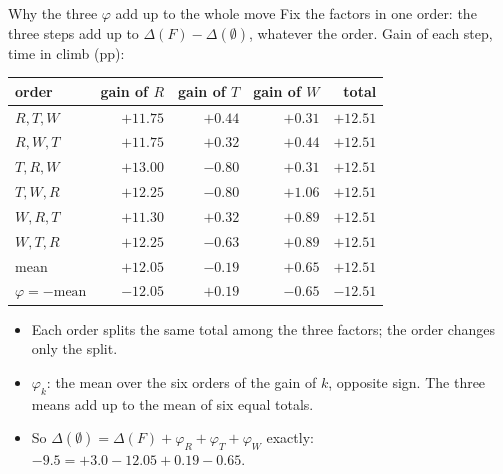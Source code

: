 \documentclass[11pt,aspectratio=169]{beamer}
\begin{document}
\begin{frame}[label=app-phisum]{Why the three $\varphi$ add up to the whole move}
\vspace{-3mm}
\noindent\small Fix the factors in one order: the three steps add up to $\Delta(F)-\Delta(\emptyset)$, whatever the order. Gain of each step, time in climb (pp):
\begin{center}\footnotesize
\renewcommand{\arraystretch}{1.0}
\begin{tabular}{@{}l r r r r@{}}
\toprule
order & gain of $R$ & gain of $T$ & gain of $W$ & total \\
\midrule
$R,T,W$ & $+11.75$ & $+0.44$ & $+0.31$ & $+12.51$ \\
$R,W,T$ & $+11.75$ & $+0.32$ & $+0.44$ & $+12.51$ \\
$T,R,W$ & $+13.00$ & $-0.80$ & $+0.31$ & $+12.51$ \\
$T,W,R$ & $+12.25$ & $-0.80$ & $+1.06$ & $+12.51$ \\
$W,R,T$ & $+11.30$ & $+0.32$ & $+0.89$ & $+12.51$ \\
$W,T,R$ & $+12.25$ & $-0.63$ & $+0.89$ & $+12.51$ \\
\midrule
mean & $+12.05$ & $-0.19$ & $+0.65$ & $+12.51$ \\
$\varphi=-\text{mean}$ & $-12.05$ & $+0.19$ & $-0.65$ & $-12.51$ \\
\bottomrule
\end{tabular}
\end{center}
\begin{itemize}\small
  \item Each order splits the same total among the three factors; the order changes only the split.
  \item $\varphi_k$: the mean over the six orders of the gain of $k$, opposite sign. The three means add up to the mean of six equal totals.
  \item So $\Delta(\emptyset)=\Delta(F)+\varphi_R+\varphi_T+\varphi_W$ exactly: $-9.5=+3.0-12.05+0.19-0.65$.
\end{itemize}
\end{frame}
\end{document}
